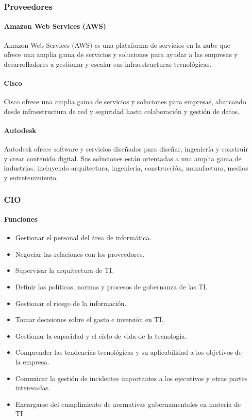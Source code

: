     \subsubsection{Proveedores }
    \paragraph*{Amazon Web Services (AWS)} Amazon Web Services (AWS) es una plataforma de servicios en la nube que ofrece una amplia gama de servicios y soluciones para ayudar a las empresas y desarrolladores a gestionar y escalar sus infraestructuras tecnológicas. 

    \paragraph*{Cisco} Cisco ofrece una amplia gama de servicios y soluciones para empresas, abarcando desde infraestructura de red y seguridad hasta colaboración y gestión de datos. 
    
    \paragraph*{Autodesk} Autodesk ofrece software y servicios diseñados para diseñar, ingeniería y construir y crear contenido digital. Sus soluciones están orientadas a una amplia gama de industrias, incluyendo arquitectura, ingeniería, construcción, manufactura, medios y entretenimiento. 

    \subsubsection{CIO}
    \paragraph{Funciones}
        \begin{itemize}
            \item Gestionar el personal del área de informática. 
            \item Negociar las relaciones con los proveedores. 
            \item Supervisar la arquitectura de TI. 
            \item Definir las políticas, normas y procesos de gobernanza de las TI. 
            \item Gestionar el riesgo de la información. 
            \item Tomar decisiones sobre el gasto e inversión en TI. 
            \item Gestionar la capacidad y el ciclo de vida de la tecnología. 
            \item Comprender las tendencias tecnológicas y su aplicabilidad a los objetivos de la empresa. 
            \item Comunicar la gestión de incidentes importantes a los ejecutivos y otras partes interesadas. 
            \item Encargarse del cumplimiento de normativas gubernamentales en materia de TI 
        \end{itemize}

